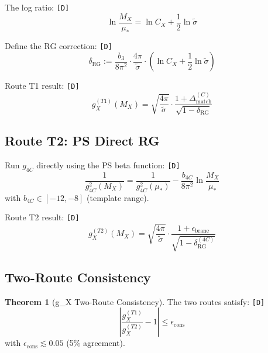 \documentclass[11pt,a4paper]{article}
\newcommand{\tagD}{\textcolor{green!50!black}{\texttt{[D]}}}
\theoremstyle{definition}
\newtheorem{theorem}{Theorem}[section]
\begin{document}
The log ratio: \tagD{}
\begin{equation}
\label{eq:log-ratio}
\ln\frac{M_X}{\mu_*} = \ln C_X + \frac{1}{2}\ln\tilde{\sigma}
\end{equation}

Define the RG correction: \tagD{}
\begin{equation}
\label{eq:delta-rg-def}
\delta_{\text{RG}} := \frac{b_3}{8\pi^2} \cdot \frac{4\pi}{\tilde{\sigma}} \cdot \left(\ln C_X + \frac{1}{2}\ln\tilde{\sigma}\right)
\end{equation}

Route T1 result: \tagD{}
\begin{equation}
\label{eq:gx-t1}
g_X^{(T1)}(M_X) = \sqrt{\frac{4\pi}{\tilde{\sigma}}} \cdot \frac{1 + \Delta_{\text{match}}^{(C)}}{\sqrt{1 - \delta_{\text{RG}}}}
\end{equation}

\subsection{Route T2: PS Direct RG}
\label{subsec:route-t2}

\begin{routebox}
Run $g_{4C}$ directly using the PS beta function: \tagD{}
\begin{equation}
\label{eq:route-t2}
\frac{1}{g_{4C}^2(M_X)} = \frac{1}{g_{4C}^2(\mu_*)} - \frac{b_{4C}}{8\pi^2} \ln\frac{M_X}{\mu_*}
\end{equation}
with $b_{4C} \in [-12, -8]$ (template range).
\end{routebox}

Route T2 result: \tagD{}
\begin{equation}
\label{eq:gx-t2}
g_X^{(T2)}(M_X) = \sqrt{\frac{4\pi}{\tilde{\sigma}}} \cdot \frac{1 + \epsilon_{\text{brane}}}{\sqrt{1 - \delta_{\text{RG}}^{(4C)}}}
\end{equation}

\subsection{Two-Route Consistency}
\label{subsec:gx-consistency}

\begin{theorem}[g\_X Two-Route Consistency]
\label{thm:gx-consistency}
The two routes satisfy: \tagD{}
\begin{equation}
\label{eq:gx-consistency}
\left|\frac{g_X^{(T1)}}{g_X^{(T2)}} - 1\right| \leq \epsilon_{\text{cons}}
\end{equation}
with $\epsilon_{\text{cons}} \lesssim 0.05$ (5\% agreement).
\end{theorem}
\end{document}

